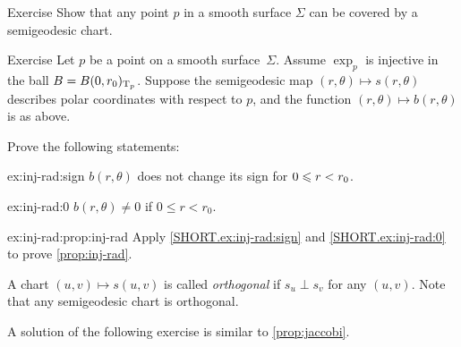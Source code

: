 \begin{thm}{Exercise}\label{ex:semigeodesc-chart}
Show that any point $p$ in a smooth surface $\Sigma$ can be covered by a semigeodesic chart.
\end{thm}

\begin{thm}{Exercise}\label{ex:inj-rad}
Let $p$ be a point on a smooth surface~$\Sigma$.
Assume $\exp_p$ is injective in the ball $B=B(0,r_0)_{\mathrm{T}_p}$.
Suppose the semigeodesic map $(r,\theta)\mapsto s(r,\theta)$ describes polar coordinates with respect to $p$, and the function $(r,\theta)\mapsto b(r,\theta)$ is as above.

Prove the following statements:

\begin{subthm}{ex:inj-rad:sign}
$b(r,\theta)$ does not change its sign for $0\z\le r\z<r_0$.
\end{subthm}

\begin{subthm}{ex:inj-rad:0}
$b(r,\theta)\ne0$ if $0\le r<r_0$.
\end{subthm}

\begin{subthm}{ex:inj-rad:prop:inj-rad}
Apply \ref{SHORT.ex:inj-rad:sign} and \ref{SHORT.ex:inj-rad:0} to prove \ref{prop:inj-rad}.
\end{subthm}
 
\end{thm}



A chart $(u,v)\mapsto s(u,v)$ is called \emph{orthogonal} if $s_u\perp s_v$ for any $(u,v)$.
Note that any semigeodesic chart is orthogonal.

A solution of the following exercise is similar to \ref{prop:jaccobi}.

